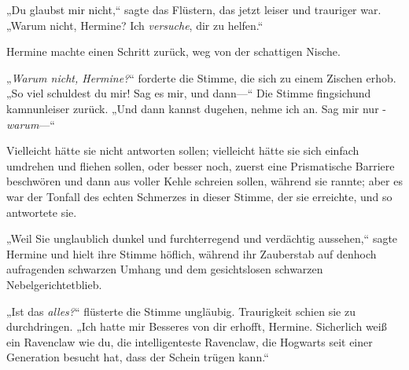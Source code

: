 „Du glaubst mir nicht,“ sagte das Flüstern, das jetzt leiser und trauriger war. „Warum nicht, Hermine? Ich \emph{versuche}, dir zu helfen.“

Hermine machte einen Schritt zurück, weg von der schattigen Nische.

„\emph{Warum nicht, Hermine?}“ forderte die Stimme, die sich zu einem Zischen erhob. „So viel schuldest du mir! Sag es mir, und dann—“ Die Stimme fingsichund kamnunleiser zurück. „Und dann kannst dugehen, nehme ich an. Sag mir nur -\emph{warum}—“

Vielleicht hätte sie nicht antworten sollen; vielleicht hätte sie sich einfach umdrehen und fliehen sollen, oder besser noch, zuerst eine Prismatische Barriere beschwören und dann aus voller Kehle schreien sollen, während sie rannte; aber es war der Tonfall des echten Schmerzes in dieser Stimme, der sie erreichte, und so antwortete sie.

„Weil Sie unglaublich dunkel und furchterregend und verdächtig aussehen,“ sagte Hermine und hielt ihre Stimme höflich, während ihr Zauberstab auf denhoch aufragenden schwarzen Umhang und dem gesichtslosen schwarzen Nebelgerichtetblieb.

„Ist das \emph{alles?}“ flüsterte die Stimme ungläubig. Traurigkeit schien sie zu durchdringen. „Ich hatte mir Besseres von dir erhofft, Hermine. Sicherlich weiß ein Ravenclaw wie du, die intelligenteste Ravenclaw, die Hogwarts seit einer Generation besucht hat, dass der Schein trügen kann.“

